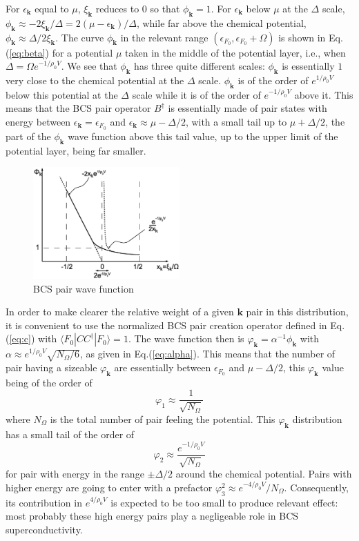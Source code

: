 \documentclass[aps,prb,preprint,groupedaddress,amsmath]{revtex4-1}
\newcommand{\vk}{\ensuremath{\mathbf{k}}}
\newcommand{\dg}{\ensuremath{\dagger}}
\begin{document}
For $\epsilon_\vk$ equal to $\mu$, $\xi_\vk$ reduces to $0$ so that $\phi_\vk=1$.  For $\epsilon_\vk$ below $\mu$ at the $\Delta$ scale, $\phi_\vk\approx-2\xi_\vk/\Delta=2(\mu-\epsilon_\vk)/\Delta $, while far above the chemical potential, $\phi_\vk\approx\Delta/2\xi_\vk$. The curve $\phi_\vk$ in the relevant range $(\epsilon_{F_0},\epsilon_{F_0}+\Omega)$ is shown in Eq.(\ref{eq:beta}) for a potential $\mu$ taken in the middle of the potential layer, i.e., when $\Delta=\Omega{}e^{-1/\rho_0V}$.  We see that $\phi_\vk$ has three quite different scales: $\phi_\vk$ is essentially $1$ very close to the chemical potential at the $\Delta$ scale. $\phi_\vk$ is of the order of $e^{1/\rho_0V}$ below this potential at the $\Delta$ scale while it is of the order of $e^{-1/\rho_0V}$ above it.  This means that the BCS pair operator $B^\dg$ is essentially made of pair states with energy between $\epsilon_\vk=\epsilon_{F_0}$ and $\epsilon_\vk\approx\mu-\Delta/2$, with a small tail up to  $\mu+\Delta/2$, the part of the $\phi_\vk$ wave function above this tail value, up to the upper limit of the potential layer, being far smaller. 
 \begin{figure}[htb]
 \includegraphics[width=0.5\textwidth]{BcsWF}
 \caption{BCS pair wave function\label{}}
 \end{figure}

In order to make clearer the relative weight of a given $\vk$ pair in this distribution, it is convenient to use the normalized BCS pair creation operator defined in Eq. (\ref{eq:c})
with $\langle{}F_0|CC^\dg|F_0\rangle=1$. The wave function then is $\varphi_\vk=\alpha^{-1}\phi_\vk$ with $\alpha\approx{}e^{1/\rho_0V}\sqrt{N_\Omega/6}$, as given in Eq.(\ref{eq:alpha}). This means that the number of pair having a sizeable $\varphi_\vk$ are essentially between $\epsilon_{F_0}$ and  $\mu-\Delta/2$, this $\varphi_\vk$ value being of the order of 
\begin{equation}
 \varphi_1\approx\frac{1}{\sqrt{N_\Omega}}
\end{equation}
where $N_\Omega$ is the total number of pair feeling the potential.  This $\varphi_\vk$ distribution has a small tail of the order of 
\begin{equation}
  \varphi_2\approx\frac{e^{-1/\rho_0V}}{\sqrt{N_\Omega}}
\end{equation}
for pair with energy in the range $\pm\Delta/2$ around the chemical potential.  Pairs with higher energy are going to enter with a prefactor $\varphi_3^2\approx{}e^{-4/\rho_0V}/N_\Omega$. Consequently, its contribution in $e^{4/\rho_0V}$ is expected to be too small to produce relevant effect: most probably these high energy pairs play a negligeable role in BCS superconductivity. 
\end{document}
